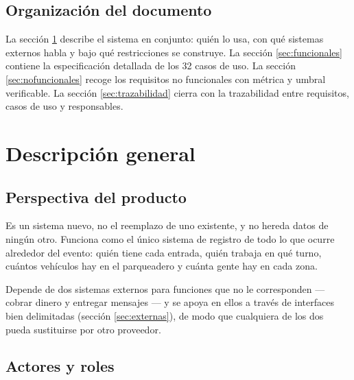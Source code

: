 \documentclass[11pt,a4paper]{article}
\begin{document}
\subsection{Organización del documento}

La sección \ref{sec:general} describe el sistema en conjunto: quién lo usa, con qué sistemas
externos habla y bajo qué restricciones se construye. La sección \ref{sec:funcionales} contiene la
especificación detallada de los 32 casos de uso. La sección \ref{sec:nofuncionales} recoge los
requisitos no funcionales con métrica y umbral verificable. La sección \ref{sec:trazabilidad}
cierra con la trazabilidad entre requisitos, casos de uso y responsables.

\section{Descripción general}
\label{sec:general}

\subsection{Perspectiva del producto}

Es un sistema nuevo, no el reemplazo de uno existente, y no hereda datos de ningún otro. Funciona
como el único sistema de registro de todo lo que ocurre alrededor del evento: quién tiene cada
entrada, quién trabaja en qué turno, cuántos vehículos hay en el parqueadero y cuánta gente hay en
cada zona.

Depende de dos sistemas externos para funciones que no le corresponden --- cobrar dinero y entregar
mensajes --- y se apoya en ellos a través de interfaces bien delimitadas (sección
\ref{sec:externas}), de modo que cualquiera de los dos pueda sustituirse por otro proveedor.

\subsection{Actores y roles}
\end{document}
